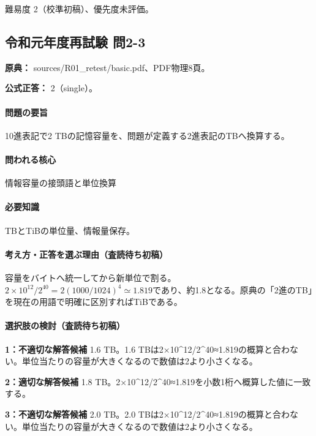 \par 難易度 2（校準初稿）、優先度未評価。

\subsection{令和元年度再試験 問2-3}
\label{q:r01-ret-basic-2-3}

\noindent\textbf{原典：} sources/R01\_retest/basic.pdf、PDF物理8頁。

\textbf{公式正答：} 2（single）。

\paragraph{問題の要旨} 10進表記で2 TBの記憶容量を、問題が定義する2進表記のTBへ換算する。

\paragraph{問われる核心} 情報容量の接頭語と単位換算

\paragraph{必要知識} TBとTiBの単位量、情報量保存。

\paragraph{考え方・正答を選ぶ理由（査読待ち初稿）} 容量をバイトへ統一してから新単位で割る。\(2\times10^{12}/2^{40}=2(1000/1024)^4\simeq1.819\)であり、約1.8となる。原典の「2進のTB」を現在の用語で明確に区別すればTiBである。

\paragraph{選択肢の検討（査読待ち初稿）}\mbox{}\par

\noindent\textbf{1：不適切な解答候補} 1.6 TB。1.6 TBは2×10\textasciicircum{}12/2\textasciicircum{}40≈1.819の概算と合わない。単位当たりの容量が大きくなるので数値は2より小さくなる。\par

\noindent\textbf{2：適切な解答候補} 1.8 TB。2×10\textasciicircum{}12/2\textasciicircum{}40≈1.819を小数1桁へ概算した値に一致する。\par

\noindent\textbf{3：不適切な解答候補} 2.0 TB。2.0 TBは2×10\textasciicircum{}12/2\textasciicircum{}40≈1.819の概算と合わない。単位当たりの容量が大きくなるので数値は2より小さくなる。\par


